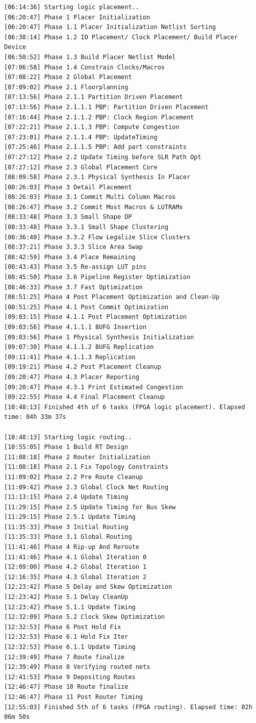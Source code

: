\begin{lstlisting}[label=code, basicstyle=\tiny, caption=Листинг файла v++\_vinc.log]
[06:14:36] Starting logic placement..
[06:20:47] Phase 1 Placer Initialization
[06:20:47] Phase 1.1 Placer Initialization Netlist Sorting
[06:38:14] Phase 1.2 IO Placement/ Clock Placement/ Build Placer Device
[06:50:52] Phase 1.3 Build Placer Netlist Model
[07:06:58] Phase 1.4 Constrain Clocks/Macros
[07:08:22] Phase 2 Global Placement
[07:09:02] Phase 2.1 Floorplanning
[07:13:56] Phase 2.1.1 Partition Driven Placement
[07:13:56] Phase 2.1.1.1 PBP: Partition Driven Placement
[07:16:44] Phase 2.1.1.2 PBP: Clock Region Placement
[07:22:21] Phase 2.1.1.3 PBP: Compute Congestion
[07:23:01] Phase 2.1.1.4 PBP: UpdateTiming
[07:25:46] Phase 2.1.1.5 PBP: Add part constraints
[07:27:12] Phase 2.2 Update Timing before SLR Path Opt
[07:27:12] Phase 2.3 Global Placement Core
[08:09:58] Phase 2.3.1 Physical Synthesis In Placer
[08:26:03] Phase 3 Detail Placement
[08:26:03] Phase 3.1 Commit Multi Column Macros
[08:26:47] Phase 3.2 Commit Most Macros & LUTRAMs
[08:33:48] Phase 3.3 Small Shape DP
[08:33:48] Phase 3.3.1 Small Shape Clustering
[08:36:40] Phase 3.3.2 Flow Legalize Slice Clusters
[08:37:21] Phase 3.3.3 Slice Area Swap
[08:42:59] Phase 3.4 Place Remaining
[08:43:43] Phase 3.5 Re-assign LUT pins
[08:45:50] Phase 3.6 Pipeline Register Optimization
[08:46:33] Phase 3.7 Fast Optimization
[08:51:25] Phase 4 Post Placement Optimization and Clean-Up
[08:51:25] Phase 4.1 Post Commit Optimization
[09:03:15] Phase 4.1.1 Post Placement Optimization
[09:03:56] Phase 4.1.1.1 BUFG Insertion
[09:03:56] Phase 1 Physical Synthesis Initialization
[09:07:30] Phase 4.1.1.2 BUFG Replication
[09:11:41] Phase 4.1.1.3 Replication
[09:19:21] Phase 4.2 Post Placement Cleanup
[09:20:47] Phase 4.3 Placer Reporting
[09:20:47] Phase 4.3.1 Print Estimated Congestion
[09:22:55] Phase 4.4 Final Placement Cleanup
[10:48:13] Finished 4th of 6 tasks (FPGA logic placement). Elapsed time: 04h 33m 37s 

[10:48:13] Starting logic routing..
[10:55:05] Phase 1 Build RT Design
[11:08:18] Phase 2 Router Initialization
[11:08:18] Phase 2.1 Fix Topology Constraints
[11:09:02] Phase 2.2 Pre Route Cleanup
[11:09:42] Phase 2.3 Global Clock Net Routing
[11:13:15] Phase 2.4 Update Timing
[11:29:15] Phase 2.5 Update Timing for Bus Skew
[11:29:15] Phase 2.5.1 Update Timing
[11:35:33] Phase 3 Initial Routing
[11:35:33] Phase 3.1 Global Routing
[11:41:46] Phase 4 Rip-up And Reroute
[11:41:46] Phase 4.1 Global Iteration 0
[12:09:00] Phase 4.2 Global Iteration 1
[12:16:35] Phase 4.3 Global Iteration 2
[12:23:42] Phase 5 Delay and Skew Optimization
[12:23:42] Phase 5.1 Delay CleanUp
[12:23:42] Phase 5.1.1 Update Timing
[12:32:09] Phase 5.2 Clock Skew Optimization
[12:32:53] Phase 6 Post Hold Fix
[12:32:53] Phase 6.1 Hold Fix Iter
[12:32:53] Phase 6.1.1 Update Timing
[12:39:49] Phase 7 Route finalize
[12:39:49] Phase 8 Verifying routed nets
[12:41:53] Phase 9 Depositing Routes
[12:46:47] Phase 10 Route finalize
[12:46:47] Phase 11 Post Router Timing
[12:55:03] Finished 5th of 6 tasks (FPGA routing). Elapsed time: 02h 06m 50s 


\end{lstlisting}
